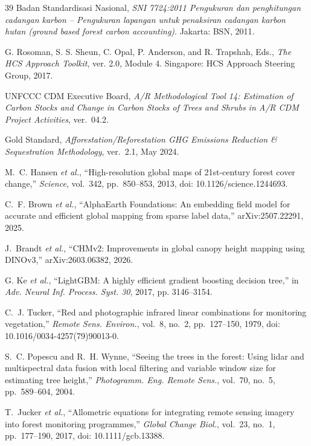 \documentclass[conference,a4paper]{IEEEtran}
\begin{document}
\begin{thebibliography}{39}
Badan Standardisasi Nasional, \textit{SNI 7724:2011 Pengukuran dan penghitungan cadangan karbon -- Pengukuran lapangan untuk penaksiran cadangan karbon hutan (ground based forest carbon accounting)}. Jakarta: BSN, 2011.

G. Rosoman, S. S. Sheun, C. Opal, P. Anderson, and R. Trapshah, Eds., \textit{The HCS Approach Toolkit}, ver. 2.0, Module 4. Singapore: HCS Approach Steering Group, 2017.

UNFCCC CDM Executive Board, \textit{A/R Methodological Tool 14: Estimation of Carbon Stocks and Change in Carbon Stocks of Trees and Shrubs in A/R CDM Project Activities}, ver.~04.2.

Gold Standard, \textit{Afforestation/Reforestation GHG Emissions Reduction \& Sequestration Methodology}, ver.~2.1, May 2024.

M.~C. Hansen \textit{et al.}, ``High-resolution global maps of 21st-century forest cover change,'' \textit{Science}, vol.~342, pp.~850--853, 2013, doi: 10.1126/science.1244693.

C.~F. Brown \textit{et al.}, ``AlphaEarth Foundations: An embedding field model for accurate and efficient global mapping from sparse label data,'' arXiv:2507.22291, 2025.

J.~Brandt \textit{et al.}, ``CHMv2: Improvements in global canopy height mapping using DINOv3,'' arXiv:2603.06382, 2026.

G. Ke \textit{et al.}, ``LightGBM: A highly efficient gradient boosting decision tree,'' in \textit{Adv. Neural Inf. Process. Syst. 30}, 2017, pp. 3146--3154.

C.~J. Tucker, ``Red and photographic infrared linear combinations for monitoring vegetation,'' \textit{Remote Sens. Environ.}, vol.~8, no.~2, pp.~127--150, 1979, doi: 10.1016/0034-4257(79)90013-0.

S.~C. Popescu and R.~H. Wynne, ``Seeing the trees in the forest: Using lidar and multispectral data fusion with local filtering and variable window size for estimating tree height,'' \textit{Photogramm. Eng. Remote Sens.}, vol.~70, no.~5, pp.~589--604, 2004.

T.~Jucker \textit{et al.}, ``Allometric equations for integrating remote sensing imagery into forest monitoring programmes,'' \textit{Global Change Biol.}, vol.~23, no.~1, pp.~177--190, 2017, doi: 10.1111/gcb.13388.


\end{thebibliography}
\end{document}

